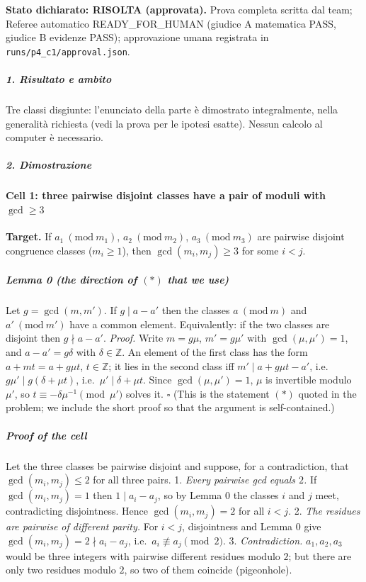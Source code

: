 \documentclass[11pt,a4paper]{article}
\begin{document}
\textbf{Stato dichiarato: RISOLTA (approvata).} Prova completa scritta
dal team; Referee automatico READY\_FOR\_HUMAN (giudice A matematica
PASS, giudice B evidenze PASS); approvazione umana registrata in
\texttt{runs/p4\_c1/approval.json}.

\subparagraph{1. Risultato e ambito}\label{risultato-e-ambito}

Tre classi disgiunte: l'enunciato della parte è dimostrato
integralmente, nella generalità richiesta (vedi la prova per le ipotesi
esatte). Nessun calcolo al computer è necessario.

\subparagraph{2. Dimostrazione}\label{dimostrazione}

\paragraph{\texorpdfstring{Cell 1: three pairwise disjoint classes have
a pair of moduli with
\(\gcd\ge3\)}{Cell 1: three pairwise disjoint classes have a pair of moduli with \textbackslash gcd\textbackslash ge3}}\label{cell-1-three-pairwise-disjoint-classes-have-a-pair-of-moduli-with-gcdge3}

\textbf{Target.} If \(a_1\ (\mathrm{mod}\ m_1)\),
\(a_2\ (\mathrm{mod}\ m_2)\), \(a_3\ (\mathrm{mod}\ m_3)\) are pairwise
disjoint congruence classes (\(m_i\ge1\)), then \(\gcd(m_i,m_j)\ge3\)
for some \(i<j\).

\subparagraph{\texorpdfstring{Lemma 0 (the direction of \((*)\) that we
use)}{Lemma 0 (the direction of (*) that we use)}}\label{lemma-0-the-direction-of-that-we-use}

Let \(g=\gcd(m,m')\). If \(g\mid a-a'\) then the classes
\(a\ (\mathrm{mod}\ m)\) and \(a'\ (\mathrm{mod}\ m')\) have a common
element. Equivalently: if the two classes are disjoint then
\(g\nmid a-a'\). \emph{Proof.} Write \(m=g\mu\), \(m'=g\mu'\) with
\(\gcd(\mu,\mu')=1\), and \(a-a'=g\delta\) with \(\delta\in\mathbb Z\).
An element of the first class has the form \(a+mt=a+g\mu t\),
\(t\in\mathbb Z\); it lies in the second class iff
\(m'\mid a+g\mu t-a'\), i.e.~\(g\mu'\mid g(\delta+\mu t)\),
i.e.~\(\mu'\mid\delta+\mu t\). Since \(\gcd(\mu,\mu')=1\), \(\mu\) is
invertible modulo \(\mu'\), so \(t\equiv-\delta\mu^{-1}\pmod{\mu'}\)
solves it. \(\square\) (This is the statement \((*)\) quoted in the
problem; we include the short proof so that the argument is
self-contained.)

\subparagraph{Proof of the cell}\label{proof-of-the-cell}

Let the three classes be pairwise disjoint and suppose, for a
contradiction, that \(\gcd(m_i,m_j)\le2\) for all three pairs. 1.
\emph{Every pairwise gcd equals \(2\).} If \(\gcd(m_i,m_j)=1\) then
\(1\mid a_i-a_j\), so by Lemma 0 the classes \(i\) and \(j\) meet,
contradicting disjointness. Hence \(\gcd(m_i,m_j)=2\) for all \(i<j\).
2. \emph{The residues are pairwise of different parity.} For \(i<j\),
disjointness and Lemma 0 give \(\gcd(m_i,m_j)=2\nmid a_i-a_j\),
i.e.~\(a_i\not\equiv a_j\pmod 2\). 3. \emph{Contradiction.}
\(a_1,a_2,a_3\) would be three integers with pairwise different residues
modulo \(2\); but there are only two residues modulo \(2\), so two of
them coincide (pigeonhole).
\end{document}
